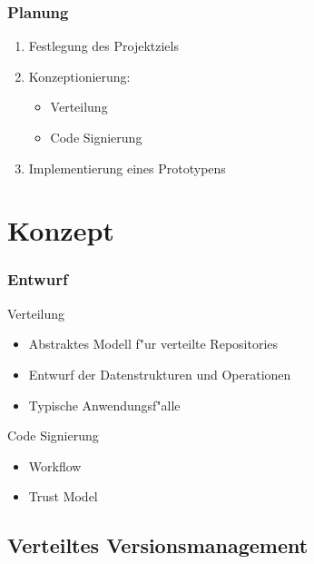 \documentclass[german]{beamer}
\begin{document}
\begin{frame}
  \frametitle{Planung}
  \begin{enumerate}
  \item Festlegung des Projektziels
  \item Konzeptionierung:
    \begin{itemize}
    \item Verteilung
    \item Code Signierung
    \end{itemize}
  \item Implementierung eines Prototypens
  \end{enumerate}
\end{frame}

\section{Konzept}

\begin{frame}
  \frametitle{Entwurf}
  \begin{block}{Verteilung}
    \begin{itemize}
    \item Abstraktes Modell f"ur verteilte Repositories
    \item Entwurf der Datenstrukturen und Operationen
    \item Typische Anwendungsf"alle
    \end{itemize}
  \end{block}
  \begin{block}{Code Signierung}
    \begin{itemize}
    \item Workflow
    \item Trust Model
    \end{itemize}
  \end{block}
\end{frame}

\subsection{Verteiltes Versionsmanagement}
\newcommand{\STRUCT}[1]{\ensuremath{\mathnormal{#1}}}
\newcommand{\NORMAL}[1]{\ensuremath{\mbox{\textnormal{#1}}}}
\def\APPEND{:\mathrel\cdot}
\end{document}
